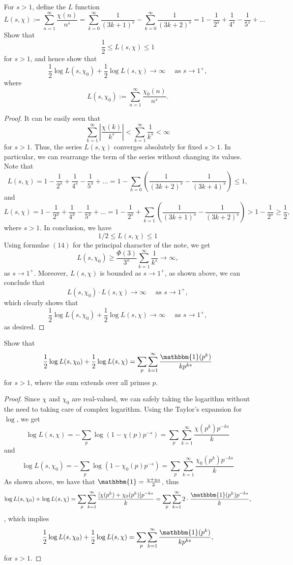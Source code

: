 \documentclass[11pt,letterpaper]{article}
\DeclareMathOperator{\1}{\mathbbm{1}}
\begin{document}
\begin{exercise}\label{ex2}
  For $s>1$, define the $L$ function
  \[L(s,\chi):= \sum_{n=1}^\infty \dfrac{\chi(n)}{n^s} = \sum_{k=0}^\infty \dfrac{1}{(3k+1)^s}-\sum_{k=0}^\infty \dfrac{1}{(3k+2)^s} = 1- \dfrac{1}{2^s}+\dfrac{1}{4^s}-\dfrac{1}{5^s}+\ldots \]
  Show that
  \[\dfrac{1}{2} \le L(s,\chi) \le 1\]
  for $s>1$, and hence show that
  \[\dfrac{1}{2} \log L(s,\chi_0) + \dfrac{1}{2}\log L(s,\chi) \to \infty \quad \text{ as } s \to 1^+,\]
  where
  \[L(s,\chi_0):= \sum_{n=1}^\infty \dfrac{\chi_0(n)}{n^s}.\]
\end{exercise}
\begin{proof}
  It can be easily seen that \[\sum_{k=1}^\infty \left|\dfrac{\chi(k)}{k^s}\right|< \sum_{k=1}^\infty \dfrac{1}{k^s}<\infty\] for $s>1$. Thus, the series $L(s,\chi)$ converges absolutely for fixed $s>1$. In particular, we can rearrange the term of the series
  without changing its values. Note that
  \[L(s,\chi) = 1- \dfrac{1}{2^s}+\dfrac{1}{4^s}-\dfrac{1}{5^s}+\ldots = 1-\sum_{k=0}\left(\dfrac{1}{(3k+2)^s}-\dfrac{1}{(3k+4)^s}\right) \le 1,\]
  and
  \[L(s,\chi) = 1- \dfrac{1}{2^x}+\dfrac{1}{4^x}-\dfrac{1}{5^x}+\ldots = 1-\dfrac{1}{2^s}+\sum_{k=1}\left(\dfrac{1}{(3k+1)^s}-\dfrac{1}{(3k+2)^s}\right)>1-\dfrac{1}{2^s}\ge \dfrac{1}{2},\]
  where $s>1$. In conclusion, we have \[1/2 \le L(s,\chi) \le 1 \] Using formulae $(14)$ for the principal character of the note, we get
  \[ L(s,\chi_0) \ge \dfrac{\Phi(3)}{3^x}\sum_{k=1}^\infty \dfrac{1}{k^s} \longrightarrow \infty,\]
  as $s \to 1^+$. Moreover, $L(s,\chi)$ is bounded as $s \to 1^+$, as shown above, we can conclude that
  \[L(s,\chi_0) \cdot L(s,\chi) \to \infty \quad \text{ as } s \to 1^+,\] which clearly shows that \[\dfrac{1}{2} \log L(s,\chi_0) + \dfrac{1}{2}\log L(s,\chi) \to \infty \quad \text{ as } s \to 1^+,\] as desired.
\end{proof}
\newpage
\begin{exercise}
  \label{ex3}
  Show that
  \[\dfrac{1}{2}\log L(s,\chi_0)+ \dfrac{1}{2}\log L(s,\chi) = \sum_{p}\sum_{k=1}^\infty \dfrac{\mathbbm{1}(p^k)}{kp^{ks}}\]
  for $s>1$, where the sum extends over all primes $p$.
\end{exercise}
\begin{proof}
  Since $\chi$ and $\chi_0$ are real-valued, we can safely taking the logarithm without the need to taking care of
  complex logarithm. Using the Taylor's expansion for $\log$, we get
  \[ \log L(s,\chi) = - \sum_{p} \log(1-\chi(p)p^{-s}) = \sum_{p}\sum_{k=1}^\infty \dfrac{\chi(p^k)p^{-ks}}{k}\]
  and
  \[ \log L(s,\chi_0) = - \sum_{p} \log(1-\chi_0(p)p^{-s}) = \sum_{p}\sum_{k=1}^\infty \dfrac{\chi_0(p^k)p^{-ks}}{k}\]
  As shown above, we have that $\mathbbm{1}= \frac{\chi+\chi_0}{2}$, thus
  \[\log L(s,\chi_0)+ \log L(s,\chi) =\sum_{p}\sum_{k=1}^\infty \dfrac{[\chi(p^k)+\chi_0(p^k)]p^{-ks}}{k}= \sum_{p}\sum_{k=1}^\infty 2\cdot \dfrac{\mathbbm{1}(p^k)p^{-ks}}{k},\], which implies \[\dfrac{1}{2}\log L(s,\chi_0)+ \dfrac{1}{2}\log L(s,\chi) = \sum_{p}\sum_{k=1}^\infty \dfrac{\mathbbm{1}(p^k)}{kp^{ks}},\] for $s>1$.
\end{proof}
\end{document}
